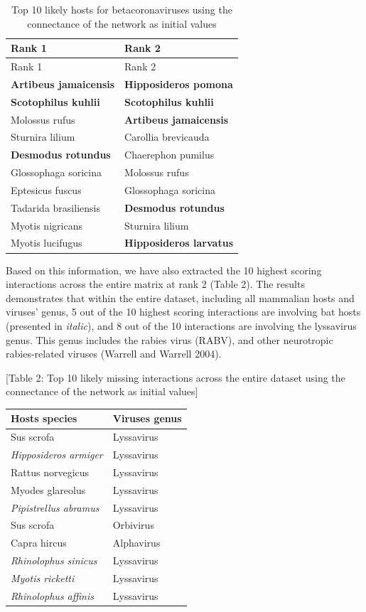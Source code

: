 \documentclass[10pt,oneside]{article}
\begin{document}
\hypertarget{tbl:top10}{}
\begin{longtable}[]{@{}ll@{}}
\caption{\label{tbl:top10}Top 10 likely hosts for betacoronaviruses
using the connectance of the network as initial values}\tabularnewline
\toprule
Rank 1 & Rank 2\tabularnewline
\midrule
\endfirsthead
\toprule
Rank 1 & Rank 2\tabularnewline
\midrule
\endhead
\textbf{Artibeus jamaicensis} & \textbf{Hipposideros
pomona}\tabularnewline
\textbf{Scotophilus kuhlii} & \textbf{Scotophilus kuhlii}\tabularnewline
Molossus rufus & \textbf{Artibeus jamaicensis}\tabularnewline
Sturnira lilium & Carollia brevicauda\tabularnewline
\textbf{Desmodus rotundus} & Chaerephon pumilus\tabularnewline
Glossophaga soricina & Molossus rufus\tabularnewline
Eptesicus fuscus & Glossophaga soricina\tabularnewline
Tadarida brasiliensis & \textbf{Desmodus rotundus}\tabularnewline
Myotis nigricans & Sturnira lilium\tabularnewline
Myotis lucifugus & \textbf{Hipposideros larvatus}\tabularnewline
\bottomrule
\end{longtable}

Based on this information, we have also extracted the 10 highest scoring
interactions across the entire matrix at rank 2 (Table 2). The results
demonstrates that within the entire dataset, including all mammalian
hosts and viruses' genus, 5 out of the 10 highest scoring interactions
are involving bat hosts (presented in \emph{italic}), and 8 out of the
10 interactions are involving the lyssavirus genus. This genus includes
the rabies virus (RABV), and other neurotropic rabies-related viruses
(Warrell and Warrell 2004).

{[}Table 2: Top 10 likely missing interactions across the entire dataset
using the connectance of the network as initial values{]}

\begin{longtable}[]{@{}ll@{}}
\toprule
Hosts species & Viruses genus\tabularnewline
\midrule
\endhead
Sus scrofa & Lyssavirus\tabularnewline
\emph{Hipposideros armiger} & Lyssavirus\tabularnewline
Rattus norvegicus & Lyssavirus\tabularnewline
Myodes glareolus & Lyssavirus\tabularnewline
\emph{Pipistrellus abramus} & Lyssavirus\tabularnewline
Sus scrofa & Orbivirus\tabularnewline
Capra hircus & Alphavirus\tabularnewline
\emph{Rhinolophus sinicus} & Lyssavirus\tabularnewline
\emph{Myotis ricketti} & Lyssavirus\tabularnewline
\emph{Rhinolophus affinis} & Lyssavirus\tabularnewline
\bottomrule
\end{longtable}
\end{document}
